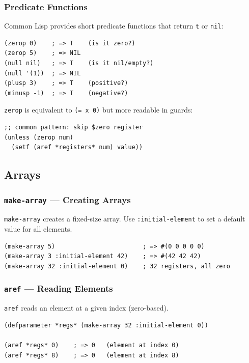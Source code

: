 \subsubsection{Predicate Functions}

Common Lisp provides short predicate functions that return
\texttt{t} or \texttt{nil}:

\begin{lstlisting}
(zerop 0)    ; => T    (is it zero?)
(zerop 5)    ; => NIL
(null nil)   ; => T    (is it nil/empty?)
(null '(1))  ; => NIL
(plusp 3)    ; => T    (positive?)
(minusp -1)  ; => T    (negative?)
\end{lstlisting}

\texttt{zerop} is equivalent to \texttt{(= x 0)} but more readable
in guards:

\begin{lstlisting}
;; common pattern: skip $zero register
(unless (zerop num)
  (setf (aref *registers* num) value))
\end{lstlisting}

\subsection{Arrays}

\subsubsection{\texttt{make-array} --- Creating Arrays}

\texttt{make-array} creates a fixed-size array.
Use \texttt{:initial-element} to set a default value for all elements.

\begin{lstlisting}
(make-array 5)                        ; => #(0 0 0 0 0)
(make-array 3 :initial-element 42)    ; => #(42 42 42)
(make-array 32 :initial-element 0)    ; 32 registers, all zero
\end{lstlisting}

\subsubsection{\texttt{aref} --- Reading Elements}

\texttt{aref} reads an element at a given index (zero-based).

\begin{lstlisting}
(defparameter *regs* (make-array 32 :initial-element 0))

(aref *regs* 0)    ; => 0   (element at index 0)
(aref *regs* 8)    ; => 0   (element at index 8)
\end{lstlisting}

